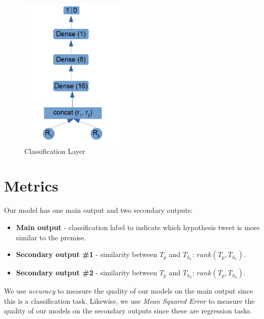 \documentclass[12pt]{report}
\begin{document}
\begin{figure}[H]	
	\centering
	\includegraphics[width=50mm, scale = 1]{images/15_classification.png}	
	\caption{Classification Layer}	
	\label{figure:classification}
\end{figure}

\section{Metrics}
Our model has one main output and two secondary outputs: 
\begin{itemize}
	\item {\bf Main output}  - classification label to indicate which hypothesis tweet is more similar to the premise. 
	\item {\bf Secondary output \#1} - similarity between $T_p$ and  $T_{h_1}$: $rank(T_p, T_{h_1})$.
	\item {\bf Secondary output \#2} - similarity between $T_p$ and  $T_{h_2}$: $rank(T_p, T_{h_2})$.
\end{itemize} 

We use {\em accuracy} to measure the quality of  our models on the main output  since this is a classification task. Likewise, 
we use  {\em Mean Squared Error} to measure the quality of  our models on the secondary outputs since these are regression tasks. 

\end{document}
